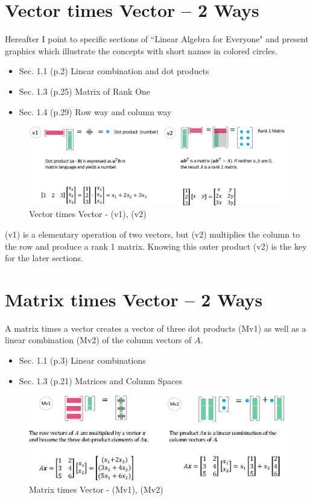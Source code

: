 \documentclass[letterpaper]{article}
\begin{document}
\section{Vector times Vector -- 2 Ways}

Hereafter I point to specific sections of ``Linear Algebra for Everyone" 
and present graphics which illustrate the concepts with short names
in colored circles.

\begin{itemize}
  \item Sec. 1.1 (p.2) Linear combination and dot products
  \item Sec. 1.3 (p.25) Matrix of Rank One
  \item Sec. 1.4 (p.29) Row way and column way
\end{itemize}

\begin{figure}[H]
  \centering
  \includegraphics[scale=0.8]{VectorTimesVector.eps}
  \caption{Vector times Vector - (v1), (v2)}
\end{figure}

(v1) is a elementary operation of two vectors, but (v2) multiplies the column to the row
and produce a rank 1 matrix. Knowing this outer product (v2) is the key for the later sections.

\section{Matrix times Vector -- 2 Ways}

A matrix times a vector creates a vector of three dot products (Mv1)
as well as a linear combination (Mv2) of the column vectors of $A$.

\begin{itemize}
  \item Sec. 1.1 (p.3) Linear combinations
  \item Sec. 1.3 (p.21) Matrices and Column Spaces
\end{itemize} 

\begin{figure}[H]
  \centering
  \includegraphics[scale=0.8]{MatrixTimesVector.eps}
  \caption{Matrix times Vector - (Mv1), (Mv2)}
\end{figure}
\end{document}

